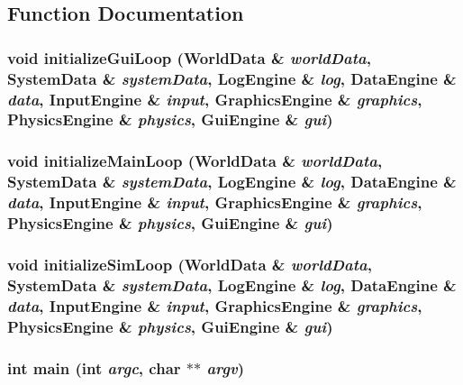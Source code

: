 \subsection{Function Documentation}
\subsubsection{\setlength{\rightskip}{0pt plus 5cm}void initialize\-Gui\-Loop ({\bf World\-Data} \& {\em world\-Data}, {\bf System\-Data} \& {\em system\-Data}, {\bf Log\-Engine} \& {\em log}, {\bf Data\-Engine} \& {\em data}, {\bf Input\-Engine} \& {\em input}, {\bf Graphics\-Engine} \& {\em graphics}, {\bf Physics\-Engine} \& {\em physics}, {\bf Gui\-Engine} \& {\em gui})}\label{main_8cpp_a6}


\subsubsection{\setlength{\rightskip}{0pt plus 5cm}void initialize\-Main\-Loop ({\bf World\-Data} \& {\em world\-Data}, {\bf System\-Data} \& {\em system\-Data}, {\bf Log\-Engine} \& {\em log}, {\bf Data\-Engine} \& {\em data}, {\bf Input\-Engine} \& {\em input}, {\bf Graphics\-Engine} \& {\em graphics}, {\bf Physics\-Engine} \& {\em physics}, {\bf Gui\-Engine} \& {\em gui})}\label{main_8cpp_a8}


\subsubsection{\setlength{\rightskip}{0pt plus 5cm}void initialize\-Sim\-Loop ({\bf World\-Data} \& {\em world\-Data}, {\bf System\-Data} \& {\em system\-Data}, {\bf Log\-Engine} \& {\em log}, {\bf Data\-Engine} \& {\em data}, {\bf Input\-Engine} \& {\em input}, {\bf Graphics\-Engine} \& {\em graphics}, {\bf Physics\-Engine} \& {\em physics}, {\bf Gui\-Engine} \& {\em gui})}\label{main_8cpp_a4}


\subsubsection{\setlength{\rightskip}{0pt plus 5cm}int main (int {\em argc}, char $\ast$$\ast$ {\em argv})}\label{main_8cpp_a10}


